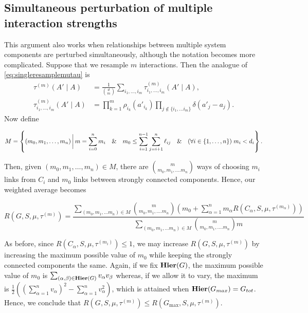 \subsection{Simultaneous perturbation of multiple interaction strengths}
This argument also works when relationships between multiple system components are perturbed simultaneously,
although the notation becomes more complicated.  Suppose that we
resample $m$ interactions.  Then the analogue of \ref{eq:singleresamplemutau} is
\begin{equation}\label{eq:multipleresamplemutau}
\begin{aligned}
\tau^{(m)}(A' \mid A) &= \frac{1}{\binom{d}{m}} \sum_{i_1, \ldots, i_m}
  \tau^{(m)}_{i_1, \ldots, i_m} (A' \mid A), \\
\tau^{(m)}_{i_1, \ldots, i_m} (A' \mid A) &=
 \prod_{k=1}^m \rho_{i_k} (a'_{i_k})
 \prod_{j \notin \{i_1, \ldots i_m\}} \delta(a'_j - a_j).
\end{aligned}
\end{equation}
Now define
\begin{widetext}
\begin{equation*}
M = \left\{(m_0, m_1, \ldots, m_n) \,\bigg|\,
m = \sum_{i=0}^n m_i \quad\&\quad
m_0 \le \sum_{i=1}^{n-1} \sum_{j=i+1}^n \ell_{ij} \quad\&\quad
(\forall i \in \{1, \ldots, n\}) \; m_i < d_i \right\}.
\end{equation*}
\end{widetext}
Then, given $(m_0, m_1, \ldots, m_n) \in M$, there are ${m \choose
m_0, m_1, \ldots. m_n}$ ways of choosing $m_i$ links from $C_i$ and
$m_0$ links between strongly connected components.  Hence, our
weighted average becomes
\begin{widetext}
\begin{equation}\label{eq:robustnessmultiple}
R(G, S, \mu, \tau^{(m)}) =
\frac{\sum\limits_{(m_0, m_1, \ldots m_n) \in M}
      {m \choose m_0, m_1, \ldots. m_n}
      \left(m_0 + \sum\limits_{\alpha=1}^n m_\alpha R(C_\alpha, S, \mu, \tau^{(m_\alpha)}) \right)}
     {\sum\limits_{(m_0, m_1, \ldots m_n) \in M}
      {m \choose m_0, m_1, \ldots. m_n} m}
\end{equation}
\end{widetext}

As before, since $R(C_\alpha, S, \mu, \tau^{(m_i)}) \le 1$, we may
increase $R(G, S, \mu, \tau^{(m)})$ by increasing the maximum
possible value of $m_0$ while keeping the strongly connected
components the same.  Again, if we fix $\mathbf{Hier}(G)$, the maximum
possible value of $m_0$ is $\sum_{(\alpha,\beta) \in \mathbf{Hier}(G)} v_\alpha v_\beta$
whereas, if we allow it to vary, the maximum is $\frac{1}{2} ((\sum_{\alpha=1}^n
v_\alpha)^2 - \sum_{\alpha=1}^n v_\alpha^2)$, which is attained when $\mathbf{Hier}(G_{max}) =
G_{tot}$.  Hence, we conclude that $R(G, S, \mu, \tau^{(m)}) \le
R(G_{\mathrm{max}}, S, \mu, \tau^{(m)})$.

